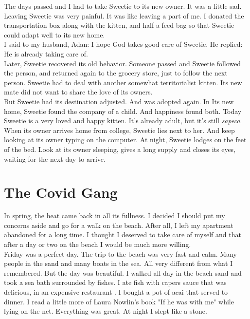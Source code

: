 \documentclass[11pt]{book}
\begin{document}
\noindent The days passed and I had to take Sweetie to its new owner. It was a little sad. Leaving Sweetie was very painful. It was like leaving a part of me. I donated the transportation box along with the kitten, and half a feed bag so that Sweetie could adapt well to its new home. \\

\noindent I said to my husband, Adan: I hope God takes good care of Sweetie. He replied: He is already taking care of. \\

\noindent Later, Sweetie recovered its old behavior. Someone passed and Sweetie followed the person, and returned again to the grocery store, just to follow the next person. Sweetie had to deal with another somewhat territorialist kitten. Its new mate did not want to share the love of its owners. \\

\noindent But Sweetie had its destination adjusted. And was adopted again. In Its new home, Sweetie found the company of a child. And happiness found both. Today Sweetie is a very loved and happy kitten. It's already adult, but it's still \emph{sapeca}. When its owner arrives home from college, Sweetie lies next to her. And keep looking at its owner typing on the computer. At night, Sweetie lodges on the feet of the bed. Look at its owner sleeping, gives a long supply and closes its eyes, waiting for the next day to arrive. \\

\chapter{The Covid Gang}

\noindent In spring, the heat came back in all its fullness. I decided I should put my concerns aside and go for a walk on the beach. After all, I left my apartment abandoned for a long time. I thought I deserved to take care of myself and that after a day or two on the beach I would be much more willing. \\

\noindent Friday was a perfect day. The trip to the beach was very fast and calm. Many people in the sand and many boats in the sea. All very different from what I remembered. But the day was beautiful. I walked all day in the beach sand and took a sea bath surrounded by fishes. I ate fish with capers sauce that was delicious, in an expensive restaurant . I bought a pot of acai that served to dinner. I read a little more of Laura Nowlin's book "If he was with me" while lying on the net. Everything was great. At night I slept like a stone. \\
\end{document}
